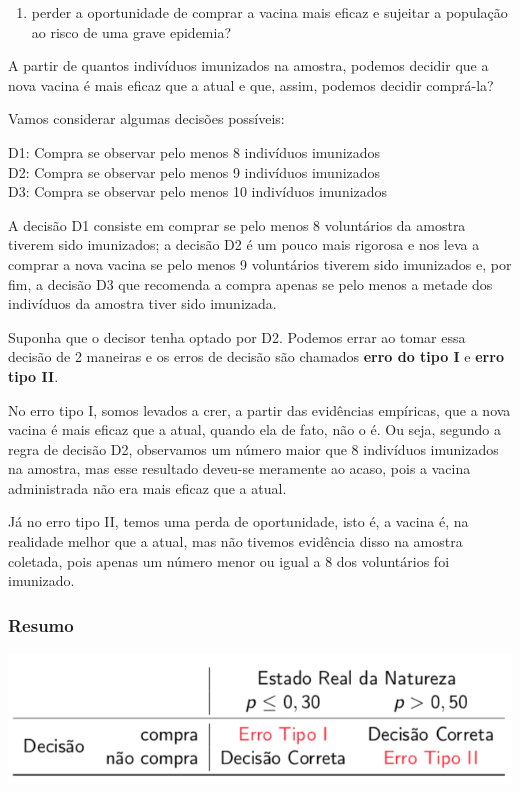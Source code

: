 \documentclass[
]{book}
\providecommand{\tightlist}{%
  \setlength{\itemsep}{0pt}\setlength{\parskip}{0pt}}
\theoremstyle{definition}
\theoremstyle{definition}
\theoremstyle{definition}
\theoremstyle{remark}
\begin{document}
\begin{enumerate}
\def\labelenumi{(\arabic{enumi})}
\setcounter{enumi}{1}
\tightlist
\item
  perder a oportunidade de comprar a vacina mais eficaz e sujeitar a população ao risco de uma grave epidemia?
\end{enumerate}

A partir de quantos indivíduos imunizados na amostra, podemos decidir que a nova vacina é mais eficaz que a atual e que, assim, podemos decidir comprá-la?

Vamos considerar algumas decisões possíveis:

D1: Compra se observar pelo menos 8 indivíduos imunizados\\
D2: Compra se observar pelo menos 9 indivíduos imunizados\\
D3: Compra se observar pelo menos 10 indivíduos imunizados

A decisão D1 consiste em comprar se pelo menos 8 voluntários da amostra tiverem sido imunizados; a decisão D2 é um pouco mais rigorosa e nos leva a comprar a nova vacina se pelo menos 9 voluntários tiverem sido imunizados e, por fim, a decisão D3 que recomenda a compra apenas se pelo menos a metade dos indivíduos da amostra tiver sido imunizada.

Suponha que o decisor tenha optado por D2. Podemos errar ao tomar essa decisão de 2 maneiras e os erros de decisão são chamados \textbf{erro do tipo I} e \textbf{erro tipo II}.

No erro tipo I, somos levados a crer, a partir das evidências empíricas, que a nova vacina é mais eficaz que a atual, quando ela de fato, não o é. Ou seja, segundo a regra de decisão D2, observamos um número maior que 8 indivíduos imunizados na amostra, mas esse resultado deveu-se meramente ao acaso, pois a vacina administrada não era mais eficaz que a atual.

Já no erro tipo II, temos uma perda de oportunidade, isto é, a vacina é, na realidade melhor que a atual, mas não tivemos evidência disso na amostra coletada, pois apenas um número menor ou igual a 8 dos voluntários foi imunizado.

\hypertarget{resumo-3}{%
\subsubsection*{Resumo}\label{resumo-3}}

\includegraphics[width=0.8\linewidth]{img/vaccine-decision-table}
\end{document}

